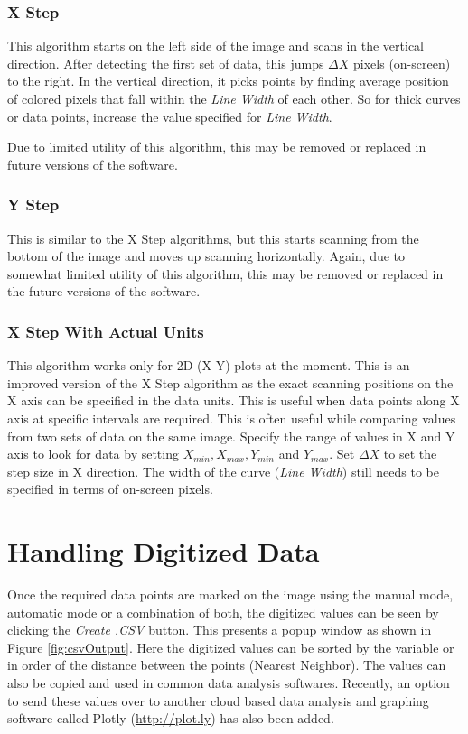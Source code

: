 \documentclass[letterpaper, 10pt]{article}
\begin{document}
\subsubsection{X Step}
This algorithm starts on the left side of the image and scans in the vertical direction. After detecting the first set of data, this jumps $\Delta X$ pixels (on-screen) to the right. In the vertical direction, it picks points by finding average position of colored pixels that fall within the \emph{Line Width} of each other. So for thick curves or data points, increase the value specified for \emph{Line Width}.

Due to limited utility of this algorithm, this may be removed or replaced in future versions of the software.
\subsubsection{Y Step}
This is similar to the X Step algorithms, but this starts scanning from the bottom of the image and moves up scanning horizontally. Again, due to somewhat limited utility of this algorithm, this may be removed or replaced in the future versions of the software.
\subsubsection{X Step With Actual Units}
This algorithm works only for 2D (X-Y) plots at the moment. This is an improved version of the X Step algorithm as the exact scanning positions on the X axis can be specified in the data units. This is useful when data points along X axis at specific intervals are required. This is often useful while comparing values from two sets of data on the same image. Specify the range of values in X and Y axis to look for data by setting $X_{min}, X_{max}, Y_{min}$ and $Y_{max}$. Set $\Delta X$ to set the step size in X direction. The width of the curve (\emph{Line Width}) still needs to be specified in terms of on-screen pixels.
\section{Handling Digitized Data}
Once the required data points are marked on the image using the manual mode, automatic mode or a combination of both, the digitized values can be seen by clicking the \emph{Create .CSV} button. This presents a popup window as shown in Figure \ref{fig:csvOutput}. Here the digitized values can be sorted by the variable or in order of the distance between the points (Nearest Neighbor). The values can also be copied and used in common data analysis softwares. Recently, an option to send these values over to another cloud based data analysis and graphing software called Plotly (\url{http://plot.ly}) has also been added.
 
\end{document}
